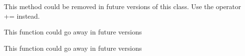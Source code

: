 
\begin{DoxyRefList}
\item[Member \mbox{\hyperlink{classProfile_a547825ab66a44ec358345df30d77c627}{Profile\+::join}} (const \mbox{\hyperlink{classProfile}{Profile}} \&profile)]\label{deprecated__deprecated000003}%
%
This method could be removed in future versions of this class. Use the operator += instead.  
\item[Member \mbox{\hyperlink{Kmer_8cpp_a77194578942a94dd58a0d5721ffa89d4}{To\+Lower}} (\mbox{\hyperlink{classKmer}{Kmer}} \&kmer)]\label{deprecated__deprecated000001}%
%
This function could go away in future versions  
\item[Member \mbox{\hyperlink{Kmer_8cpp_a529f93b76b54a04d3d72be14476cd38e}{To\+Upper}} (\mbox{\hyperlink{classKmer}{Kmer}} \&kmer)]\label{deprecated__deprecated000002}%
%
This function could go away in future versions 
\end{DoxyRefList}